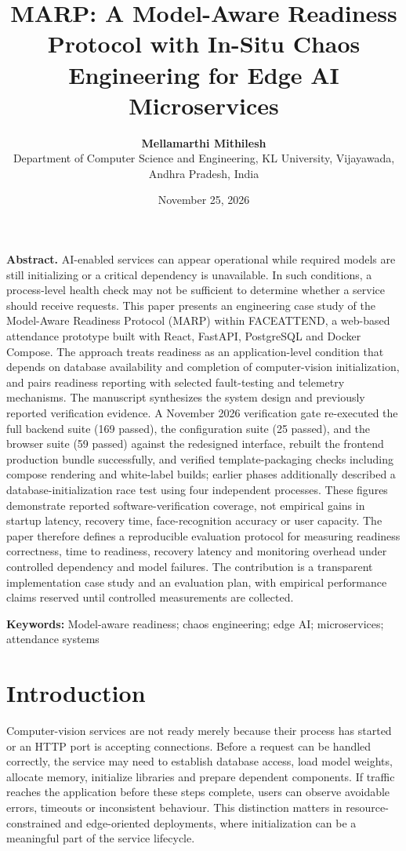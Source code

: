 \documentclass[11pt,a4paper]{article}
\title{\textbf{MARP: A Model-Aware Readiness Protocol with In-Situ Chaos Engineering for Edge AI Microservices}}
\author{\textbf{Mellamarthi Mithilesh}\\
\small Department of Computer Science and Engineering, KL University, Vijayawada, Andhra Pradesh, India}
\date{November 25, 2026}
\begin{document}
\maketitle

\textbf{Abstract.} AI-enabled services can appear operational while required models are still initializing or a critical dependency is unavailable. In such conditions, a process-level health check may not be sufficient to determine whether a service should receive requests. This paper presents an engineering case study of the Model-Aware Readiness Protocol (MARP) within FACEATTEND, a web-based attendance prototype built with React, FastAPI, PostgreSQL and Docker Compose. The approach treats readiness as an application-level condition that depends on database availability and completion of computer-vision initialization, and pairs readiness reporting with selected fault-testing and telemetry mechanisms. The manuscript synthesizes the system design and previously reported verification evidence. A November 2026 verification gate re-executed the full backend suite (169 passed), the configuration suite (25 passed), and the browser suite (59 passed) against the redesigned interface, rebuilt the frontend production bundle successfully, and verified template-packaging checks including compose rendering and white-label builds; earlier phases additionally described a database-initialization race test using four independent processes. These figures demonstrate reported software-verification coverage, not empirical gains in startup latency, recovery time, face-recognition accuracy or user capacity. The paper therefore defines a reproducible evaluation protocol for measuring readiness correctness, time to readiness, recovery latency and monitoring overhead under controlled dependency and model failures. The contribution is a transparent implementation case study and an evaluation plan, with empirical performance claims reserved until controlled measurements are collected.

\textbf{Keywords:} Model-aware readiness; chaos engineering; edge AI; microservices; attendance systems

\section{Introduction}

Computer-vision services are not ready merely because their process has started or an HTTP port is accepting connections. Before a request can be handled correctly, the service may need to establish database access, load model weights, allocate memory, initialize libraries and prepare dependent components. If traffic reaches the application before these steps complete, users can observe avoidable errors, timeouts or inconsistent behaviour. This distinction matters in resource-constrained and edge-oriented deployments, where initialization can be a meaningful part of the service lifecycle.
\end{document}
